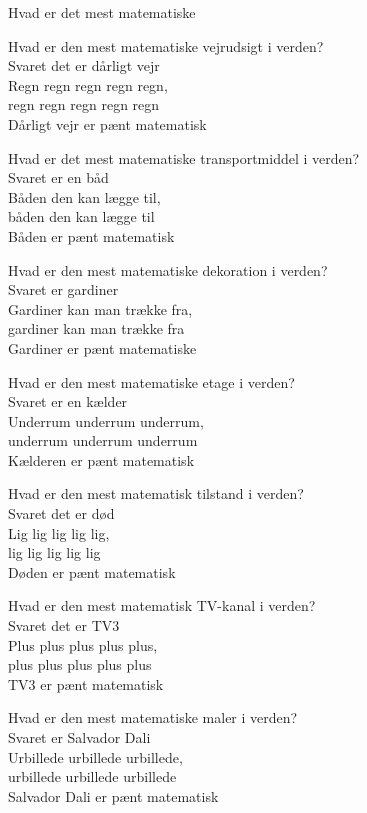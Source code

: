 \begin{song}{Hvad er det mest matematiske}
  \begin{SBVerse}
    Hvad er den mest matematiske vejrudsigt i verden?\\
    Svaret det er dårligt vejr\\
    Regn regn regn regn regn,\\
    regn regn regn regn regn\\
    Dårligt vejr er pænt matematisk
  \end{SBVerse}

  \begin{SBVerse}
    Hvad er det mest matematiske transportmiddel i verden?\\
    Svaret er en båd\\
    Båden den kan lægge til,\\
    båden den kan lægge til\\
    Båden er pænt matematisk
  \end{SBVerse}

  \begin{SBVerse}
    Hvad er den mest matematiske dekoration i verden?\\
    Svaret er gardiner\\
    Gardiner kan man trække fra,\\
    gardiner kan man trække fra\\
    Gardiner er pænt matematiske
  \end{SBVerse}

  \begin{SBVerse}
    Hvad er den mest matematiske etage i verden?\\
    Svaret er en kælder\\
    Underrum underrum underrum,\\
    underrum underrum underrum\\
    Kælderen er pænt matematisk
  \end{SBVerse}

  \begin{SBVerse}
    Hvad er den mest matematisk tilstand i verden?\\
    Svaret det er død\\
    Lig lig lig lig lig,\\
    lig lig lig lig lig\\
    Døden er pænt matematisk
  \end{SBVerse}

  \begin{SBVerse}
    Hvad er den mest matematisk TV-kanal i verden?\\
    Svaret det er TV3\\
    Plus plus plus plus plus,\\
    plus plus plus plus plus\\
    TV3 er pænt matematisk
  \end{SBVerse}

  \begin{SBVerse}
    Hvad er den mest matematiske maler i verden?\\
    Svaret er Salvador Dali\\
    Urbillede urbillede urbillede,\\
    urbillede urbillede urbillede\\
    Salvador Dali er pænt matematisk
  \end{SBVerse}
\end{song}